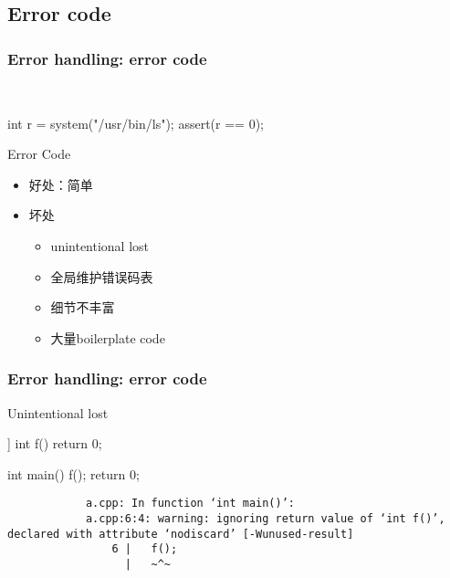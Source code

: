 \documentclass[UTF8,lualatex]{ctexbeamer}
\begin{document}
\subsection{Error code}

\begin{frame}[fragile]
    \frametitle{Error handling: error code}
    \begin{exampleblock}{~}
        \small
        \begin{cppcode}
            int r = system("/usr/bin/ls");
            assert(r == 0);
        \end{cppcode}
    \end{exampleblock}
    \begin{block}{Error Code}
        \begin{itemize}
            \item 好处：简单
            \item 坏处
                \begin{itemize}
                    \item unintentional lost
                    \item 全局维护错误码表
                    \item 细节不丰富
                    \item 大量boilerplate code
                \end{itemize}
        \end{itemize}
    \end{block}
\end{frame}

\begin{frame}[fragile]
    \frametitle{Error handling: error code}
    \begin{exampleblock}{Unintentional lost}
        \footnotesize
        \begin{cppcode}
            [[nodiscard]] int f() {
                return 0;
            }

            int main() {
                f();
                return 0;
            }
        \end{cppcode}
        \begin{verbatim}
            a.cpp: In function ‘int main()’:
            a.cpp:6:4: warning: ignoring return value of ‘int f()’, declared with attribute ‘nodiscard’ [-Wunused-result]
                6 |   f();
                  |   ~^~
        \end{verbatim}
    \end{exampleblock}
\end{frame}
\end{document}
